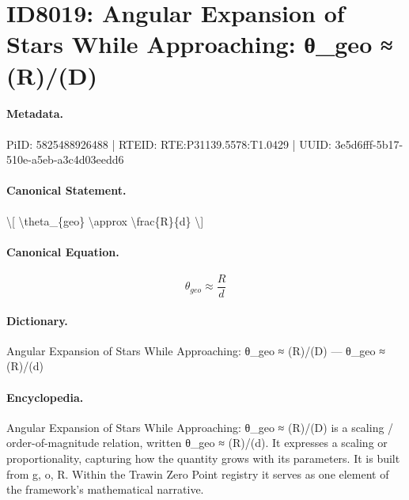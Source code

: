\section*{ID8019: Angular Expansion of Stars While Approaching: θ\_geo ≈ (R)/(D)}
\paragraph{Metadata.}
PiID: 5825488926488 | RTEID: RTE:P31139.5578:T1.0429 | UUID: 3e5d6fff-5b17-510e-a5eb-a3c4d03eedd6

\paragraph{Canonical Statement.}
\textbackslash{}[ \textbackslash{}theta\_\{geo\} \textbackslash{}approx \textbackslash{}frac\{R\}\{d\} \textbackslash{}]

\paragraph{Canonical Equation.}
\[
\theta_{geo} \approx \frac{R}{d}
\]

\paragraph{Dictionary.}
Angular Expansion of Stars While Approaching: θ\_geo ≈ (R)/(D) — θ\_geo ≈ (R)/(d)

\paragraph{Encyclopedia.}
Angular Expansion of Stars While Approaching: θ\_geo ≈ (R)/(D) is a scaling / order-of-magnitude relation, written θ\_geo ≈ (R)/(d). It expresses a scaling or proportionality, capturing how the quantity grows with its parameters. It is built from g, o, R. Within the Trawin Zero Point registry it serves as one element of the framework's mathematical narrative.
